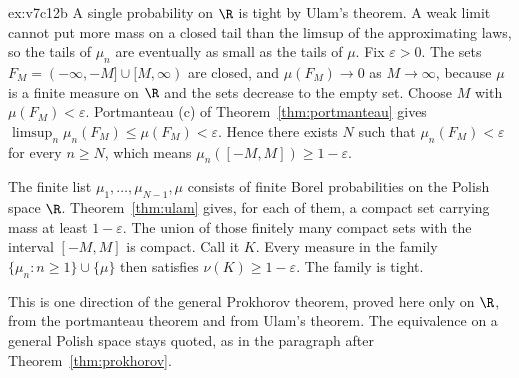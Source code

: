 \begin{solution}{ex:v7c12b}
\idea A single probability on $\R$ is tight by Ulam's theorem. A weak limit cannot put more mass on a closed tail than the limsup of the
approximating laws, so the tails of $\mu_n$ are eventually as small as the tails of $\mu$.
\writeup Fix $\varepsilon>0$. The sets $F_M=(-\infty,-M]\cup[M,\infty)$ are closed, and $\mu(F_M)\to 0$ as $M\to\infty$, because $\mu$ is a finite
measure on $\R$ and the sets decrease to the empty set. Choose $M$ with $\mu(F_M)<\varepsilon$. Portmanteau (c) of Theorem~\ref{thm:portmanteau}
gives $\limsup_n\mu_n(F_M)\le\mu(F_M)<\varepsilon$. Hence there exists $N$ such that $\mu_n(F_M)<\varepsilon$ for every $n\ge N$, which means
$\mu_n([-M,M])\ge 1-\varepsilon$.

The finite list $\mu_1,\ldots,\mu_{N-1},\mu$ consists of finite Borel probabilities on the Polish space $\R$. Theorem~\ref{thm:ulam} gives, for
each of them, a compact set carrying mass at least $1-\varepsilon$. The union of those finitely many compact sets with the interval $[-M,M]$ is
compact. Call it $K$. Every measure in the family $\{\mu_n:n\ge 1\}\cup\{\mu\}$ then satisfies $\nu(K)\ge 1-\varepsilon$. The family is tight.

This is one direction of the general Prokhorov theorem, proved here only on $\R$, from the portmanteau theorem and from Ulam's theorem. The
equivalence on a general Polish space stays quoted, as in the paragraph after Theorem~\ref{thm:prokhorov}.
\end{solution}

